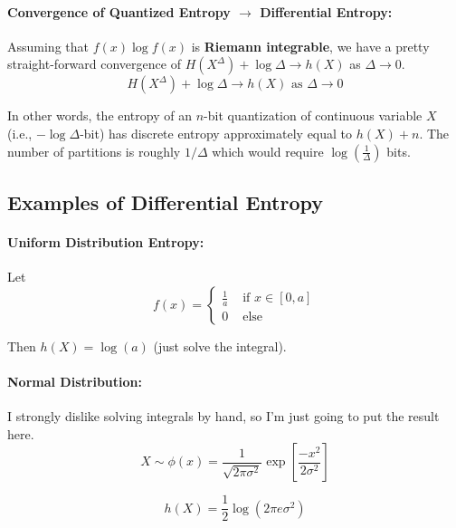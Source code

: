 \documentclass[a4paper,12pt]{report}
\begin{document}
\paragraph{Convergence of Quantized Entropy $\to$ Differential Entropy: }
Assuming that $f(x)\log f(x)$ is \textbf{Riemann integrable}, we have a pretty
straight-forward convergence of $H(X^\Delta) + \log \Delta \to h(X)$ as $\Delta \to 0$.
\begin{equation}
	H(X^\Delta) + \log \Delta \to h(X) \text{  as } \Delta \to 0
\end{equation}

In other words, the entropy of an $n$-bit quantization of continuous variable
$X$ (i.e., $-\log \Delta$-bit) has discrete entropy approximately equal to $h(X)
+ n$. The number of partitions is roughly $1/\Delta$ which would require $\log
(\frac 1 {\Delta})$ bits.












\subsection{Examples of Differential Entropy}

\paragraph{Uniform Distribution Entropy: } Let 
\begin{equation}
	f(x) = \begin{cases} 
		\frac{1}{a} & \text{ if } x \in [0,a] \\
		0 			& \text{ else}
	\end{cases}
\end{equation}

Then $h(X) = \log(a)$ (just solve the integral). 


\paragraph{Normal Distribution: } I strongly dislike solving integrals by hand,
so I'm just going to put the result here.
\begin{equation}
	X \sim \phi(x) = \frac{1}{\sqrt{2\pi\sigma^2}} \exp[\frac{-x^2}{2\sigma^2}]
\end{equation}

\begin{equation}
	h(X) = \frac{1}{2} \log (2\pi e \sigma^2)
\end{equation}
\end{document}

